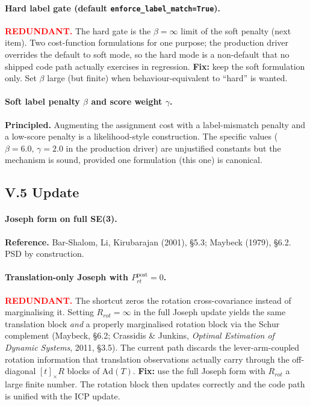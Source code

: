 \documentclass[11pt]{article}
\newcommand{\REDUNDANT}{\textcolor{red}{\textbf{REDUNDANT.}}}
\newcommand{\REFERENCE}{\textbf{Reference.}}
\newcommand{\PRINCIPLED}{\textbf{Principled.}}
\newcommand{\Ad}{\mathrm{Ad}}
\begin{document}
\paragraph{Hard label gate (default \texttt{enforce\_label\_match=True}).}
\REDUNDANT{} The hard gate is the $\beta=\infty$ limit of the soft
penalty (next item). Two cost-function formulations for one purpose;
the production driver overrides the default to soft mode, so the hard
mode is a non-default that no shipped code path actually exercises in
regression.
\textbf{Fix:} keep the soft formulation only. Set $\beta$ large
(but finite) when behaviour-equivalent to ``hard'' is wanted.

\paragraph{Soft label penalty $\beta$ and score weight $\gamma$.}
\PRINCIPLED{} Augmenting the assignment cost with a label-mismatch
penalty and a low-score penalty is a likelihood-style construction.
The specific values ($\beta=6.0,\,\gamma=2.0$ in the production driver)
are unjustified constants but the mechanism is sound, provided one
formulation (this one) is canonical.

\subsection*{V.5 Update}

\paragraph{Joseph form on full SE(3).}
\REFERENCE{} Bar-Shalom, Li, Kirubarajan (2001), \S 5.3; Maybeck
(1979), \S 6.2. PSD by construction.

\paragraph{Translation-only Joseph with $P_{rt}^{\text{post}}=0$.}
\REDUNDANT{} The shortcut zeros the rotation cross-covariance instead
of marginalising it. Setting $R_{rot}=\infty$ in the full Joseph
update yields the same translation block \emph{and} a properly
marginalised rotation block via the Schur complement (Maybeck,
\S 6.2; Crassidis \& Junkins, \emph{Optimal Estimation of Dynamic
Systems}, 2011, \S 3.5). The current path discards the
lever-arm-coupled rotation information that translation observations
actually carry through the off-diagonal $[t]_\times R$ blocks of
$\Ad(T)$.
\textbf{Fix:} use the full Joseph form with $R_{rot}$ a large finite
number. The rotation block then updates correctly and the code path
is unified with the ICP update.
\end{document}
